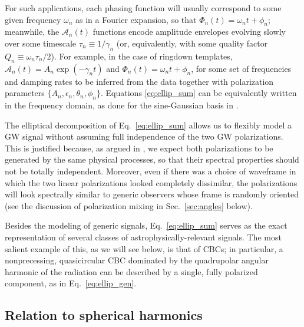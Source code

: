 \documentclass[aps,prd,twocolumn,superscriptaddress,preprintnumbers,floatfix,nofootinbib]{revtex4-2}
\newcommand*{\eq}[1]{Eq.~\eqref{eq:#1}}
\begin{document}
For such applications, each phasing function will usually correspond to some given frequency $\omega_n$ as in a Fourier expansion, so that $\Phi_n(t) = \omega_n t + \phi_n$; meanwhile, the $\mathcal{A}_n(t)$ functions encode amplitude envelopes evolving slowly over some timescale $\tau_n \equiv 1/\gamma_n$ (or, equivalently, with some quality factor $Q_n \equiv \omega_n \tau_n/2$).
For example, in the case of ringdown templates, $\mathcal{A}_n(t) = A_n \exp(-\gamma_n t)$ and $\Phi_n(t) = \omega_n t + \phi_n$, for some set of frequencies and damping rates to be inferred from the data together with polarization parameters $\{ A_n, \epsilon_n, \theta_n, \phi_n\}$.
Equations \eqref{eq:ellip_sum} can be equivalently written in the frequency domain, as done for the sine-Gaussian basis in \cite{Cornish:2014kda,Cornish:2020dwh}.

The elliptical decomposition of Eq.~\eqref{eq:ellip_sum} allows us to flexibly model a GW signal without assuming full independence of the two GW polarizations.
This is justified because, as argued in \cite{Chatziioannou:2021mij}, we expect both polarizations to be generated by the same physical processes, so that their spectral properties should not be totally independent.
Moreover, even if there was a choice of waveframe in which the two linear polarizations looked completely dissimilar, the polarizations will look spectrally similar to generic observers whose frame is randomly oriented (see the discussion of polarization mixing in Sec.~\ref{sec:angles} below).

Besides the modeling of generic signals, \eq{ellip_sum} serves as the exact representation of several classes of astrophysically-relevant signals.
The most salient example of this, as we will see below, is that of CBCs; in particular, a nonprecessing, quasicircular CBC dominated by the quadrupolar angular harmonic of the radiation can be described by a single, fully polarized component, as in \eq{ellip_gen}.



\subsection{Relation to spherical harmonics}
\label{sec:harmonics}
\end{document}
